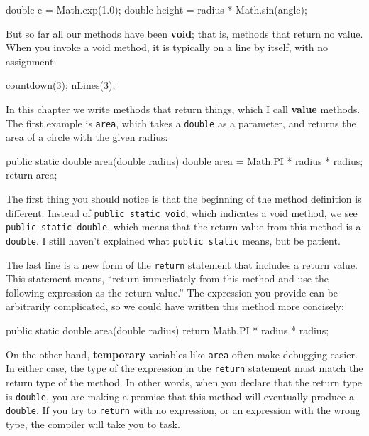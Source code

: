 \documentclass[12pt]{book}
\begin{document}
\begin{code}
    double e = Math.exp(1.0);
    double height = radius * Math.sin(angle);
\end{code}

But so far all our methods have been {\bf void}; that is, methods that return no value.
When you invoke a void method, it is typically on a line by itself, with no assignment:

\begin{code}
    countdown(3);
    nLines(3);
\end{code}

In this chapter we write methods that return things, which I call {\bf value} methods.
The first example is {\tt area}, which takes a {\tt double} as a parameter, and returns the area of a circle with the given radius:

\begin{code}
    public static double area(double radius) {
        double area = Math.PI * radius * radius;
        return area;
    }
\end{code}


The first thing you should notice is that the beginning of the method definition is different.
Instead of {\tt public static void}, which indicates a void method, we see {\tt public static double}, which means that the return value from this method is a {\tt double}.
I still haven't explained what {\tt public static} means, but be patient.

The last line is a new form of the {\tt return} statement that includes a return value.
This statement means, ``return immediately from this method and use the following expression as the return value.''
The expression you provide can be arbitrarily complicated, so we could have written this method more concisely:

\begin{code}
    public static double area(double radius) {
        return Math.PI * radius * radius;
    }
\end{code}

On the other hand, {\bf temporary} variables like {\tt area} often make debugging easier.
In either case, the type of the expression in the {\tt return} statement must match the return type of the method.
In other words, when you declare that the return type is {\tt double}, you are making a promise that this method will eventually produce a {\tt double}.
If you try to {\tt return} with no expression, or an expression with the wrong type, the compiler will take you to task.
\end{document}
